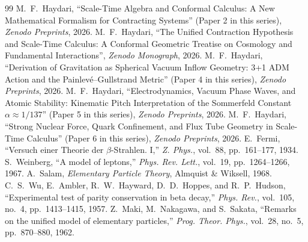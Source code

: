 \documentclass[11pt,a4paper]{article}
\begin{document}
\begin{thebibliography}{99}
     M.~F.~Haydari, ``Scale-Time Algebra and Conformal Calculus: A New Mathematical Formalism for Contracting Systems'' (Paper 2 in this series), \textit{Zenodo Preprints}, 2026.
     M.~F.~Haydari, ``The Unified Contraction Hypothesis and Scale-Time Calculus: A Conformal Geometric Treatise on Cosmology and Fundamental Interactions'', \textit{Zenodo Monograph}, 2026.
     M.~F.~Haydari, ``Derivation of Gravitation as Spherical Vacuum Inflow Geometry: 3+1 ADM Action and the Painlevé--Gullstrand Metric'' (Paper 4 in this series), \textit{Zenodo Preprints}, 2026.
     M.~F.~Haydari, ``Electrodynamics, Vacuum Phase Waves, and Atomic Stability: Kinematic Pitch Interpretation of the Sommerfeld Constant $\alpha \approx 1/137$'' (Paper 5 in this series), \textit{Zenodo Preprints}, 2026.
     M.~F.~Haydari, ``Strong Nuclear Force, Quark Confinement, and Flux Tube Geometry in Scale-Time Calculus'' (Paper 6 in this series), \textit{Zenodo Preprints}, 2026.
     E.~Fermi, ``Versuch einer Theorie der $\beta$-Strahlen. I,'' \textit{Z. Phys.}, vol.~88, pp.~161--177, 1934.
     S.~Weinberg, ``A model of leptons,'' \textit{Phys. Rev. Lett.}, vol.~19, pp.~1264--1266, 1967.
     A.~Salam, \textit{Elementary Particle Theory}, Almquist \& Wiksell, 1968.
     C.~S.~Wu, E.~Ambler, R.~W.~Hayward, D.~D.~Hoppes, and R.~P.~Hudson, ``Experimental test of parity conservation in beta decay,'' \textit{Phys. Rev.}, vol.~105, no.~4, pp.~1413--1415, 1957.
     Z.~Maki, M.~Nakagawa, and S.~Sakata, ``Remarks on the unified model of elementary particles,'' \textit{Prog. Theor. Phys.}, vol.~28, no.~5, pp.~870--880, 1962.
\end{thebibliography}
\end{document}
